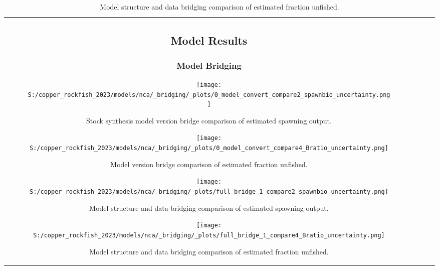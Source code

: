 \documentclass[11pt,
  letterpaper,
]{article}
\begin{document}
\begin{longtable}[t]{c>{\centering\arraybackslash}p{2cm}>{\centering\arraybackslash}p{2cm}>{\centering\arraybackslash}p{2cm}}
\pagebreak

\subsection{Model Results}\label{model-results}

\subsubsection{Model Bridging}\label{model-bridging}

\begin{figure}
{\centering
\texttt{[image: S:/copper\_rockfish\_2023/models/nca/\_bridging/\_plots/0\_model\_convert\_compare2\_spawnbio\_uncertainty.png]}
}
\caption{Stock synthesis model version bridge comparison of estimated spawning output.\label{fig:bridge-ssb}}
\end{figure}

\pagebreak

\begin{figure}
{\centering
\texttt{[image: S:/copper\_rockfish\_2023/models/nca/\_bridging/\_plots/0\_model\_convert\_compare4\_Bratio\_uncertainty.png]}
}
\caption{Model version bridge comparison of estimated fraction unfished.\label{fig:bridge-depl}}
\end{figure}

\pagebreak

\begin{figure}
{\centering
\texttt{[image: S:/copper\_rockfish\_2023/models/nca/\_bridging/\_plots/full\_bridge\_1\_compare2\_spawnbio\_uncertainty.png]}
}
\caption{Model structure and data bridging comparison of estimated spawning output.\label{fig:data-bridge-ssb-1}}
\end{figure}

\pagebreak

\begin{figure}
{\centering
\texttt{[image: S:/copper\_rockfish\_2023/models/nca/\_bridging/\_plots/full\_bridge\_1\_compare4\_Bratio\_uncertainty.png]}
}
\caption{Model structure and data bridging comparison of estimated fraction unfished.\label{fig:data-bridge-depl-1}}
\end{figure}


\end{longtable}
\end{document}
